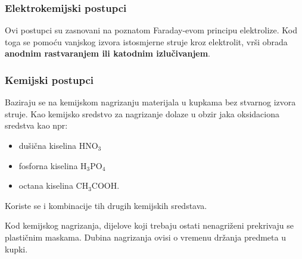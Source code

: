 \documentclass[a4paper,12pt]{article}
\numberwithin{figure}{section}
\begin{document}
\subsubsection{Elektrokemijski postupci}
Ovi postupci su zasnovani na poznatom Faraday-evom principu elektrolize. Kod toga se pomoću vanjskog izvora istosmjerne struje kroz elektrolit, vrši obrada \textbf{anodnim rastvaranjem ili katodnim izlučivanjem}.
\subsubsection{Kemijski postupci}
Baziraju se na kemijskom nagrizanju materijala u kupkama bez stvarnog izvora struje. Kao kemijsko sredstvo za nagrizanje dolaze u obzir jaka oksidaciona sredstva kao npr:
\begin{itemize}
\item dušična kiselina HNO$_{3}$
\item fosforna kiselina H$_{3}$PO$_{4}$
\item  octana kiselina CH$_{3}$COOH.
\end{itemize}
Koriste se i kombinacije tih drugih kemijskih sredstava. \par
Kod kemijskog nagrizanja, dijelove koji trebaju ostati nenagriženi prekrivaju se plastičnim maskama. Dubina nagrizanja ovisi o vremenu držanja predmeta u kupki.
\end{document}

